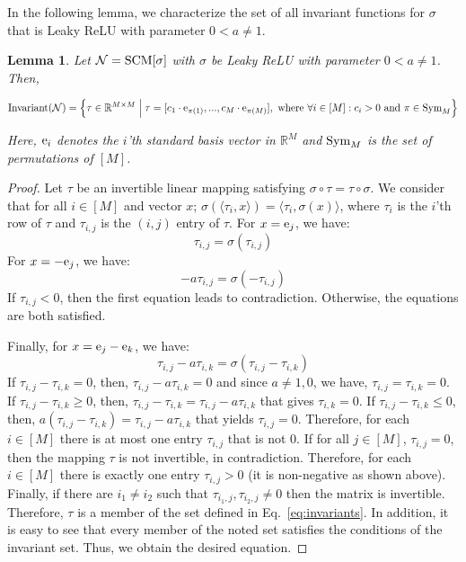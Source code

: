 \documentclass{article} %
\newtheorem{lem}{Lemma}
\newcommand{\Inv}{\textnormal{Invariant}}
\begin{document}
In the following lemma, we characterize the set of all invariant functions for $\sigma$ that is Leaky ReLU with parameter $0<a \neq 1$.

\begin{lem}\label{lem:invariantSet} Let $\mathcal{N} = \textnormal{SCM}[\sigma]$ with $\sigma$ be Leaky ReLU with parameter $0<a\neq 1$. Then,
\begin{small}
\begin{equation}\label{eq:invariants}
\Inv(\mathcal{N}) = \left\{\tau \in \mathbb{R}^{M\times M} \;\Big\vert\; 
\tau=[c_1\cdot \textnormal{e}_{\pi(1)},...,c_M \cdot \textnormal{e}_{\pi(M)}], \textnormal{ where $\forall i \in [M]:c_i > 0$ and $\pi \in \textnormal{Sym}_M$} 
\right\}
\end{equation}
\end{small}
Here, $\textnormal{e}_i$ denotes the $i$'th standard basis vector in $\mathbb{R}^M$ and $\textnormal{Sym}_M$ is the set of permutations of $[M]$.
\end{lem}

\begin{proof} Let $\tau$ be an invertible linear mapping satisfying $\sigma \circ \tau = \tau \circ \sigma$. We consider that for all $i \in [M]$ and vector $x$; $\sigma (\langle \tau_i,x\rangle) = \langle \tau_i , \sigma(x)\rangle$, where $\tau_i$ is the $i$'th row of $\tau$ and $\tau_{i,j}$ is the $(i,j)$ entry of $\tau$. For $x = \textnormal{e}_j$, we have:
\begin{equation}
\tau_{i,j} = \sigma(\tau_{i,j})
\end{equation}
For $x = -\textnormal{e}_j$, we have:
\begin{equation}
-a\tau_{i,j} = \sigma(-\tau_{i,j})
\end{equation}
If $\tau_{i,j} < 0$, then the first equation leads to contradiction. Otherwise, the equations are both satisfied. 

Finally, for $x = \textnormal{e}_j-\textnormal{e}_k$, we have:
\begin{equation}
\tau_{i,j}-a\tau_{i,k} = \sigma(\tau_{i,j} - \tau_{i,k})
\end{equation}
If $\tau_{i,j} - \tau_{i,k} = 0$, then, $\tau_{i,j}-a\tau_{i,k}=0$ and since $a \neq 1,0$, we have, $\tau_{i,j} = \tau_{i,k} = 0$. If $\tau_{i,j} - \tau_{i,k} \geq 0$, then,
$\tau_{i,j} - \tau_{i,k} = \tau_{i,j}-a\tau_{i,k}$ that gives $\tau_{i,k} = 0$. If $\tau_{i,j} - \tau_{i,k} \leq 0$, then,
$a(\tau_{i,j} - \tau_{i,k}) = \tau_{i,j}-a\tau_{i,k}$ that yields $\tau_{i,j} = 0$. Therefore, for each $i \in [M]$ there is at most one entry $\tau_{i,j}$ that is not $0$. If for all $j \in [M]$, $\tau_{i,j} = 0$, then the mapping $\tau$ is not invertible, in contradiction. Therefore, for each $i \in [M]$ there is exactly one entry $\tau_{i,j} > 0$ (it is non-negative as shown above). Finally, if there are $i_1\neq i_2$ such that $\tau_{i_1,j},\tau_{i_2,j} \neq 0$ then the matrix is invertible. Therefore, $\tau$ is a member of the set defined in Eq.~\ref{eq:invariants}. In addition, it is easy to see that every member of the noted set satisfies the conditions of the invariant set. Thus, we obtain the desired equation. 
\end{proof}
\end{document}
